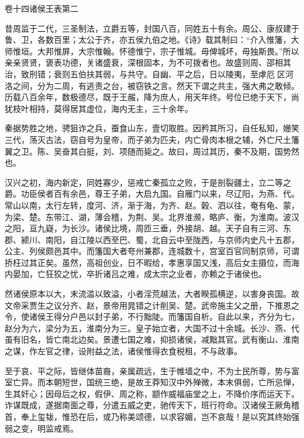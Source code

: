 \documentclass[12pt,UTF8]{ctexbook}
\begin{document}
卷十四诸侯王表第二



昔周监于二代，三圣制法，立爵五等，封国八百，同姓五十有余。周公、康叔建于鲁、卫，各数百里；太公于齐，亦五侯九伯之地。《诗》载其制曰：“介入惟籓，大师惟垣。大邦惟屏，大宗惟翰。怀德惟宁，宗子惟城。毋俾城坏，毋独斯畏。”所以亲亲贤贤，褒表功德，关诸盛衰，深根固本，为不可拨者也。故盛则周、邵相其治，致刑错；衰则五伯扶其弱，与共守。自幽、平之后，日以陵夷，至虖厄区河洛之间，分为二周，有逃责之台，被窃铁之言。然天下谓之共主，强大弗之敢倾。历载八百余年，数极德尽，既于王赧，降为庶人，用天年终。号位已绝于天下，尚犹枝叶相持，莫得居其虚位，海内无主，三十余年。



秦据势胜之地，骋狙诈之兵，蚕食山东，壹切取胜。因矜其所习，自任私知，姗笑三代，荡灭古法，窃自号为皇帝，而子弟为匹夫，内亡骨肉本根之辅，外亡尺土籓翼之卫。陈、吴奋其白挺，刘、项随而毙之。故曰，周过其历，秦不及期，国势然也。



汉兴之初，海内新定，同姓寡少，惩戒亡秦孤立之败，于是剖裂疆土，立二等之爵。功臣侯者百有余邑，尊王子弟，大启九国。自雁门以来，尽辽阳，为燕、代。常山以南，太行左转，度河、济，渐于海，为齐、赵。穀、泗以往，奄有龟、蒙，为梁、楚。东带江、湖，薄会稽，为荆、吴。北界淮濒，略庐、衡，为淮南。波汉之阳，亘九嶷，为长沙。诸侯比境，周匝三垂，外接胡、越。天子自有三河、东郡、颍川、南阳，自江陵以西至巴、蜀，北自云中至陇西，与京师内史凡十五郡，公主、列侯颇邑其中。而籓国大者夸州兼郡，连城数十，宫室百官同制京师，可谓挢枉过其正矣。虽然，高祖创业，日不暇给，孝惠享国又浅，高后女主摄位，而海内晏加，亡狂狡之忧，卒折诸吕之难，成太宗之业者，亦赖之于诸侯也。



然诸侯原本以大，末流滥以致溢，小者淫荒越法，大者睽孤横逆，以害身丧国。故文帝采贾生之议分齐、赵，景帝用晁错之计削吴、楚。武帝施主父之册，下推恩之令，使诸侯王得分户邑以封子弟，不行黜陡。而籓国自析。自此以来，齐分为七，赵分为六，梁分为五，淮南分为三。皇子始立者，大国不过十余城。长沙、燕、代虽有旧名，皆亡南北边矣。景遭七国之难，抑损诸侯，减黜其官。武有衡山、淮南之谋，作左官之律，设附益之法，诸侯惟得衣食税租，不与政事。



至于哀、平之际，皆继体苗裔，亲属疏远，生于帷墙之中，不为士民所尊，势与富室亡异。而本朝短世，国统三绝，是故王莽知汉中外殚微，本末俱弱，亡所忌惮，生其奸心；因母后之权，假伊、周之称，颛作威福庙堂之上，不降价序而运天下。诈谋既成，遂据南面之尊，分遣五威之吏，驰传天下，班行符命。汉诸侯王厥角稽首，奉上玺韨，惟恐在后，或乃称美颂德，以求容媚，岂不哀哉！是以究其终始强弱之变，明监戒焉。
\end{document}
